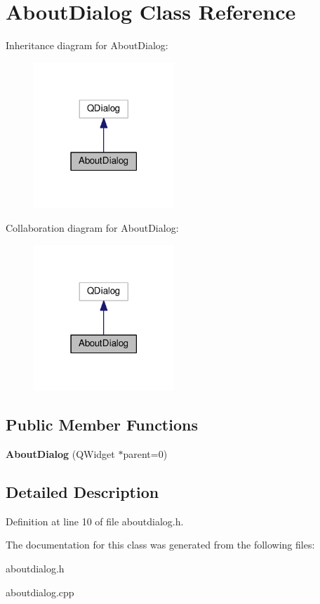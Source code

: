 \hypertarget{class_about_dialog}{}\section{About\+Dialog Class Reference}
\label{class_about_dialog}


Inheritance diagram for About\+Dialog\+:
\nopagebreak
\begin{figure}[H]
\begin{center}
\leavevmode
\includegraphics[width=150pt]{class_about_dialog__inherit__graph}
\end{center}
\end{figure}


Collaboration diagram for About\+Dialog\+:
\nopagebreak
\begin{figure}[H]
\begin{center}
\leavevmode
\includegraphics[width=150pt]{class_about_dialog__coll__graph}
\end{center}
\end{figure}
\subsection*{Public Member Functions}
\begin{DoxyCompactItemize}
\item 
\mbox{\label{class_about_dialog_ad96fc2ce8de7568ace543b7c69c71c56}} 
{\bfseries About\+Dialog} (Q\+Widget $\ast$parent=0)
\end{DoxyCompactItemize}


\subsection{Detailed Description}


Definition at line 10 of file aboutdialog.\+h.



The documentation for this class was generated from the following files\+:\begin{DoxyCompactItemize}
\item 
aboutdialog.\+h\item 
aboutdialog.\+cpp\end{DoxyCompactItemize}
